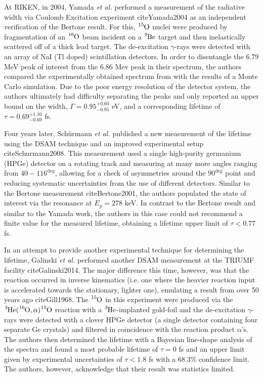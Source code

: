 At RIKEN, in 2004, Yamada \textit{et al.} performed a measurement of the radiative width via Coulomb Excitation experiment cite{Yamada2004} as an independent verification of the Bertone result. For this, $\ce{^{15}O}$ nuclei were produced by fragmentation of an $\ce{^{16}O}$ beam incident on a $\ce{^{9}Be}$ target and then inelastically scattered off of a thick lead target. The de-excitation $\gamma$-rays were detected with an array of NaI (Tl doped) scintillation detectors. In order to disentangle the 6.79 MeV peak of interest from the 6.86 Mev peak in their spectrum, the authors compared the experimentally obtained spectrum from with the results of a Monte Carlo simulation. Due to the poor energy resolution of the detector system, the authors ultimately had difficulty separating the peaks and only reported an upper bound on the width, $\Gamma = 0.95^{+0.60}_{-0.95}$ eV, and a corresponding lifetime of $\tau = 0.69 ^{+1.10}_{-0.69}$ fs. 

Four years later, Sch{\"u}rmann \textit{et al.} published a new measurement of the lifetime using the DSAM technique and an improved experimental setup cite{Schurmann2008}. This measurement used a single high-purity germanium (HPGe) detector on a rotating track and measuring at many more angles ranging from $40 - 116^{\deg}$, allowing for a check of asymmetries around the $90^{\deg}$ point and reducing systematic uncertainties from the use of different detectors. Similar to the Bertone measurement cite{Bertone2001}, the authors populated the state of interest via the resonance at $E_{p} = 278$ keV. In contrast to the Bertone result and similar to the Yamada work, the authors in this case could not recommend a finite value for the measured lifetime, obtaining a lifetime upper limit of $\tau < 0.77$ fs. 

In an attempt to provide another experimental technique for determining the lifetime, Galinski \textit{et al.} performed another DSAM measurement at the TRIUMF facility cite{Galinski2014}. The major difference this time, however, was that the reaction occurred in inverse kinematics (i.e. one where the heavier reaction input is accelerated towards the stationary, lighter one), emulating a result from over 50 years ago cite{Gill1968}. The $\ce{^{15}O}$ in this experiment were produced via the $\ce{^{3}He}(\ce{^{16}O},\alpha)\ce{^{15}O}$ reaction with a $\ce{^{3}He}$-implanted gold-foil and the de-excitation $\gamma$-rays were detected with a clover HPGe detector (a single detector containing four separate Ge crystals) and filtered in coincidence with the reaction product $\alpha$'s. The authors then determined the lifetime with a Bayesian line-shape analysis of the spectra and found a most probable lifetime of $\tau = 0$ fs and an upper limit given by experimental uncertainties of $\tau < 1.8$ fs with a 68.3\% confidence limit. The authors, however, acknowledge that their result was statistics limited.


